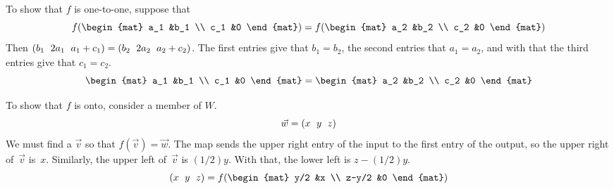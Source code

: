 \begin{frame}
To show that $f$ is one-to-one, suppose that
\begin{equation*}
  f(\begin{mat}
    a_1 &b_1 \\
    c_1 &0
  \end{mat})
  =
  f(\begin{mat}
    a_2 &b_2 \\
    c_2 &0
  \end{mat})
\end{equation*}
Then $\rowvec{b_1 &2a_1 &a_1+c_1}=\rowvec{b_2 &2a_2 &a_2+c_2}$.
The first entries give that $b_1=b_2$, the second entries that $a_1=a_2$, 
and with that the third entries give that $c_1=c_2$.
\begin{equation*}
  \begin{mat}
    a_1 &b_1 \\
    c_1 &0
  \end{mat}
  =
  \begin{mat}
    a_2 &b_2 \\
    c_2 &0
  \end{mat}
\end{equation*}

\pause
To show that $f$ is onto, consider a member of $W$.
\begin{equation*}
  \vec{w}=\rowvec{x &y &z}
\end{equation*}
We must find a $\vec{v}$ so that $f(\vec{v})=\vec{w}$.
The map sends the upper right entry of the input to
the first entry of the output, so the upper right of~$\vec{v}$ 
is~$x$.
Similarly, the upper left of~$\vec{v}$ is $(1/2)y$.
With that, the lower left is $z-(1/2)y$.
\begin{equation*}
  \rowvec{x &y &z}
  =f(\begin{mat}
    y/2    &x \\
    z-y/2  &0
  \end{mat})
\end{equation*}
\end{frame}
